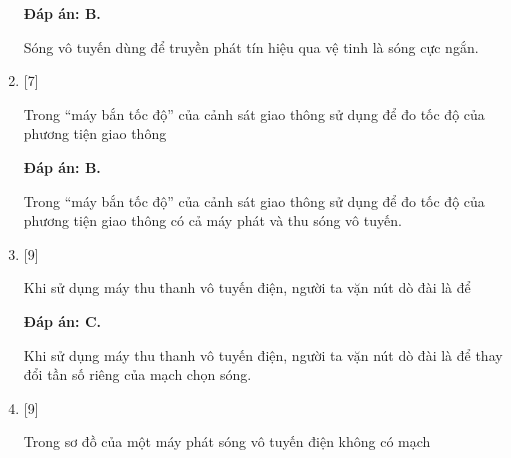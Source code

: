 \begin{enumerate}[label=\bfseries Câu \arabic*:]
	\hideall
	{		\textbf{Đáp án: B.}
		
		Sóng vô tuyến dùng để truyền phát tín hiệu qua vệ tinh là sóng cực ngắn.
		
	}
	
	\item {} [7]
	
	{Trong “máy bắn tốc độ” của cảnh sát giao thông sử dụng để đo tốc độ của phương tiện giao thông
	}
	
	\hideall
	{		\textbf{Đáp án: B.}
		
		Trong “máy bắn tốc độ” của cảnh sát giao thông sử dụng để đo tốc độ của phương tiện giao thông có cả máy phát và thu sóng vô tuyến.
		
	}
	
	\item {} [9]
	
	{Khi sử dụng máy thu thanh vô tuyến điện, người ta vặn nút dò đài là để
	}
	
	\hideall
	{		\textbf{Đáp án: C.}
		
		Khi sử dụng máy thu thanh vô tuyến điện, người ta vặn nút dò đài là để thay đổi tần số riêng của mạch chọn sóng.
		
	}
	
	\item {} [9]
	
	{Trong sơ đồ của một máy phát sóng vô tuyến điện không có mạch
	}
	

\end{enumerate}
